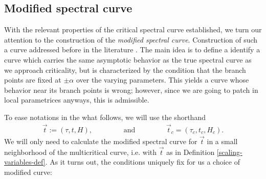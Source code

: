 \documentclass[usenames,dvipsnames]{article}
\theoremstyle{definition}
\numberwithin{equation}{section}
\numberwithin{figure}{section}
\begin{document}
\subsection{Modified spectral curve}
With the relevant properties of the critical spectral curve established, we turn our attention to the construction of the \textit{modified spectral curve}. Construction of such a curve addressed before in the literature \cite{Bleher-Kuijlaars,DKZ,DG}. The main idea is to define a identify
a curve which carries the same asymptotic behavior as the true spectral curve as we approach criticality, but is characterized by the condition that the branch points are fixed at $\pm \alpha$ over the varying parameters. This yields a curve whose behavior near its branch points is wrong; however, since we are going to patch in local parametrices anyways, this is admissible.

To ease notations in the what follows, we will use the shorthand 
    \begin{align*}
        \vec{t} := (\tau,t,H), \qquad\qquad \text{ and } \qquad\qquad \vec{t}_c = (\tau_c,t_c,H_c).
    \end{align*}
We will only need to calculate the modified spectral curve for $\vec{t}$ in a small neighborhood of the multicritical curve, i.e. with $\vec{t}$ as in Definition \ref{scaling-variables-def}. As it turns out, the conditions uniquely fix for us a choice of modified curve:
\end{document}

